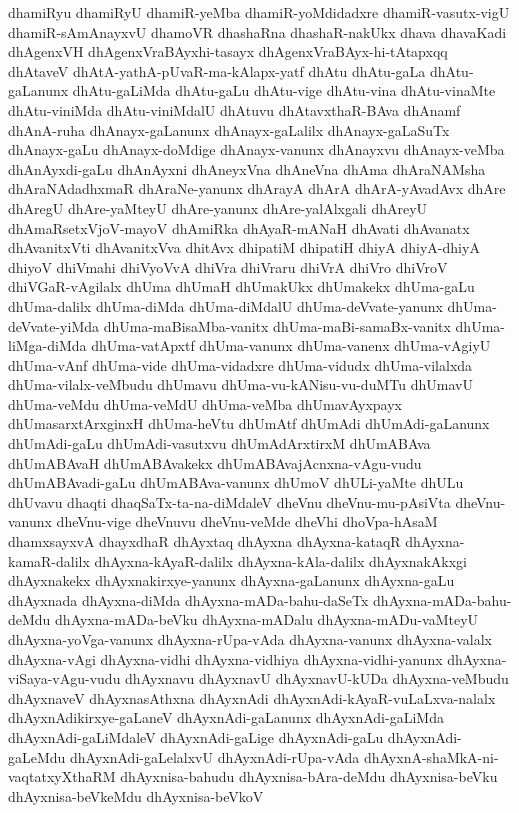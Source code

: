 {dhamiRyu
dhamiRyU
dhamiR-yeMba
dhamiR-yoMdidadxre
dhamiR-vasutx-vigU
dhamiR-sAmAnayxvU
dhamoVR
dhashaRna
dhashaR-nakUkx
dhava
dhavaKadi
dhAgenxVH
dhAgenxVraBAyxhi-tasayx
dhAgenxVraBAyx-hi-tAtapxqq
dhAtaveV
dhAtA-yathA-pUvaR-ma-kAlapx-yatf
dhAtu
dhAtu-gaLa
dhAtu-gaLanunx
dhAtu-gaLiMda
dhAtu-gaLu
dhAtu-vige
dhAtu-vina
dhAtu-vinaMte
dhAtu-viniMda
dhAtu-viniMdalU
dhAtuvu
dhAtavxthaR-BAva
dhAnamf
dhAnA-ruha
dhAnayx-gaLanunx
dhAnayx-gaLalilx
dhAnayx-gaLaSuTx
dhAnayx-gaLu
dhAnayx-doMdige
dhAnayx-vanunx
dhAnayxvu
dhAnayx-veMba
dhAnAyxdi-gaLu
dhAnAyxni
dhAneyxVna
dhAneVna
dhAma
dhAraNAMsha
dhAraNAdadhxmaR
dhAraNe-yanunx
dhArayA
dhArA
dhArA-yAvadAvx
dhAre
dhAregU
dhAre-yaMteyU
dhAre-yanunx
dhAre-yalAlxgali
dhAreyU
dhAmaRsetxVjoV-mayoV
dhAmiRka
dhAyaR-mANaH
dhAvati
dhAvanatx
dhAvanitxVti
dhAvanitxVva
dhitAvx
dhipatiM
dhipatiH
dhiyA
dhiyA-dhiyA
dhiyoV
dhiVmahi
dhiVyoVvA
dhiVra
dhiVraru
dhiVrA
dhiVro
dhiVroV
dhiVGaR-vAgilalx
dhUma
dhUmaH
dhUmakUkx
dhUmakekx
dhUma-gaLu
dhUma-dalilx
dhUma-diMda
dhUma-diMdalU
dhUma-deVvate-yanunx
dhUma-deVvate-yiMda
dhUma-maBisaMba-vanitx
dhUma-maBi-samaBx-vanitx
dhUma-liMga-diMda
dhUma-vatApxtf
dhUma-vanunx
dhUma-vanenx
dhUma-vAgiyU
dhUma-vAnf
dhUma-vide
dhUma-vidadxre
dhUma-vidudx
dhUma-vilalxda
dhUma-vilalx-veMbudu
dhUmavu
dhUma-vu-kANisu-vu-duMTu
dhUmavU
dhUma-veMdu
dhUma-veMdU
dhUma-veMba
dhUmavAyxpayx
dhUmasarxtArxginxH
dhUma-heVtu
dhUmAtf
dhUmAdi
dhUmAdi-gaLanunx
dhUmAdi-gaLu
dhUmAdi-vasutxvu
dhUmAdArxtirxM
dhUmABAva
dhUmABAvaH
dhUmABAvakekx
dhUmABAvajAcnxna-vAgu-vudu
dhUmABAvadi-gaLu
dhUmABAva-vanunx
dhUmoV
dhULi-yaMte
dhULu
dhUvavu
dhaqti
dhaqSaTx-ta-na-diMdaleV
dheVnu
dheVnu-mu-pAsiVta
dheVnu-vanunx
dheVnu-vige
dheVnuvu
dheVnu-veMde
dheVhi
dhoVpa-hAsaM
dhamxsayxvA
dhayxdhaR
dhAyxtaq
dhAyxna
dhAyxna-kataqR
dhAyxna-kamaR-dalilx
dhAyxna-kAyaR-dalilx
dhAyxna-kAla-dalilx
dhAyxnakAkxgi
dhAyxnakekx
dhAyxnakirxye-yanunx
dhAyxna-gaLanunx
dhAyxna-gaLu
dhAyxnada
dhAyxna-diMda
dhAyxna-mADa-bahu-daSeTx
dhAyxna-mADa-bahu-deMdu
dhAyxna-mADa-beVku
dhAyxna-mADalu
dhAyxna-mADu-vaMteyU
dhAyxna-yoVga-vanunx
dhAyxna-rUpa-vAda
dhAyxna-vanunx
dhAyxna-valalx
dhAyxna-vAgi
dhAyxna-vidhi
dhAyxna-vidhiya
dhAyxna-vidhi-yanunx
dhAyxna-viSaya-vAgu-vudu
dhAyxnavu
dhAyxnavU
dhAyxnavU-kUDa
dhAyxna-veMbudu
dhAyxnaveV
dhAyxnasAthxna
dhAyxnAdi
dhAyxnAdi-kAyaR-vuLaLxva-nalalx
dhAyxnAdikirxye-gaLaneV
dhAyxnAdi-gaLanunx
dhAyxnAdi-gaLiMda
dhAyxnAdi-gaLiMdaleV
dhAyxnAdi-gaLige
dhAyxnAdi-gaLu
dhAyxnAdi-gaLeMdu
dhAyxnAdi-gaLelalxvU
dhAyxnAdi-rUpa-vAda
dhAyxnA-shaMkA-ni-vaqtatxyXthaRM
dhAyxnisa-bahudu
dhAyxnisa-bAra-deMdu
dhAyxnisa-beVku
dhAyxnisa-beVkeMdu
dhAyxnisa-beVkoV
}
